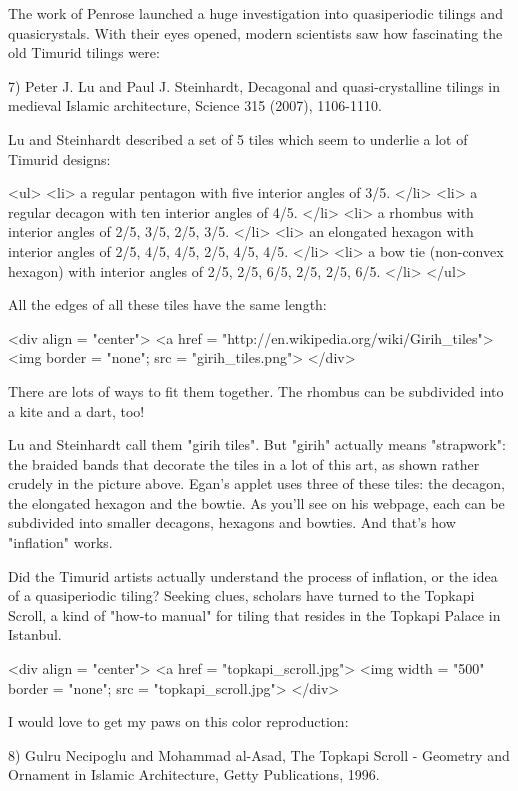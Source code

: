 The work of Penrose launched a huge investigation into quasiperiodic
tilings and quasicrystals.  With their eyes opened, modern scientists
saw how fascinating the old Timurid tilings were:

7) Peter J. Lu and Paul J. Steinhardt, Decagonal and quasi-crystalline 
tilings in medieval Islamic architecture, Science 315 (2007), 1106-1110.

Lu and Steinhardt described a set of 5 tiles which seem to underlie a
lot of Timurid designs:

<ul>
<li>
a regular pentagon with five interior angles of 3\pi /5.
</li>
<li>
a regular decagon with ten interior angles of 4\pi /5.
</li>
<li>
a rhombus with interior angles of 2\pi /5, 3\pi /5, 2\pi /5, 3\pi /5.
</li>
<li>
an elongated hexagon with interior angles of 2\pi /5, 4\pi /5, 
4\pi /5, 2\pi /5, 4\pi /5, 4\pi /5.
</li>
<li>
a bow tie (non-convex hexagon) with interior angles of 
2\pi /5, 2\pi /5, 6\pi /5, 2\pi /5, 2\pi /5, 6\pi /5.
</li>
</ul>

All the edges of all these tiles have the same length:

<div align = "center">
<a href = "http://en.wikipedia.org/wiki/Girih_tiles">
<img border = "none"; src = "girih_tiles.png">
</div>

There are lots of ways to fit them together.  The rhombus can be
subdivided into a kite and a dart, too!

Lu and Steinhardt call them "girih tiles".  But
"girih" actually means "strapwork": the braided
bands that decorate the tiles in a lot of this art, as shown rather
crudely in the picture above.  Egan's applet uses three of these
tiles: the decagon, the elongated hexagon and the bowtie.  As you'll
see on his webpage, each can be subdivided into smaller decagons,
hexagons and bowties.  And that's how "inflation" works.

Did the Timurid artists actually understand the process of inflation,
or the idea of a quasiperiodic tiling?  Seeking clues, scholars have
turned to the Topkapi Scroll, a kind of "how-to manual" for tiling 
that resides in the Topkapi Palace in Istanbul.  

<div align = "center">
<a href = "topkapi_scroll.jpg">
<img width = "500" border = "none"; src = "topkapi_scroll.jpg">
</div>

I would love to get my paws on this color reproduction:

8) Gulru Necipoglu and Mohammad al-Asad, The Topkapi Scroll - Geometry 
and Ornament in Islamic Architecture, Getty Publications, 1996.

